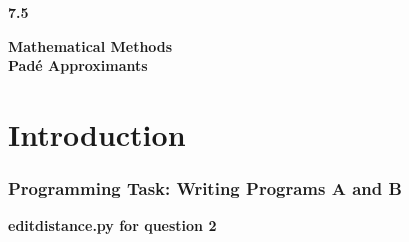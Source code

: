 \documentclass[12pt, a4paper]{article}
\begin{document}
	
	\setlength{\parindent}{0pt}
	\captionsetup{justification=centering}
	\lstset{
		showstringspaces=false
	}
	
	
	\begin{titlepage}
		\LARGE
		\textbf{7.5}
		\begin{center}
			\vspace*{7cm}
			
			\LARGE
			\textbf{Mathematical Methods}
			\\
			\vspace{1cm}
			\textbf{Pad\'e Approximants}
			
			\vspace{0.5cm}
		\end{center}
	\end{titlepage}

\section{Introduction}	
	
\subsubsection*{Programming Task: Writing Programs A and B}




\pagebreak
\textbf{edit\textunderscore distance.py for question 2}\centering\label{question1}

\vspace{2cm}
\end{document}

